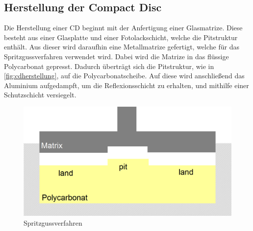 \subsection{Herstellung der Compact Disc}
\label{subsec:cdherstellung}

Die Herstellung einer CD beginnt mit der Anfertigung einer Glasmatrize. Diese
besteht aus einer Glasplatte und einer Fotolackschicht, welche die Pitstruktur
enthält. Aus dieser wird daraufhin eine Metallmatrize gefertigt, welche für das
Spritzgussverfahren verwendet wird. Dabei wird die Matrize in das flüssige
Polycarbonat gepresst. Dadurch überträgt sich die Pitstruktur, wie in
\autoref{fig:cdherstellung}, auf die Polycarbonatscheibe. Auf diese wird
anschließend das Aluminium aufgedampft, um die Reflexionsschicht zu erhalten,
und mithilfe einer Schutzschicht versiegelt. \cite{cdp}

\begin{figure}[h]
  \begin{center}
      \begin{minipage}[t]{\textwidth}
        \begin{center}
            \includegraphics[height=0.1\textheight]{Bilder/Optische_Datentraeger_Die_Compact_Disc/Herstellung/cdherstellung.png}
            \caption[Spritzgussverfahren \newline \url{http://daten.didaktikchemie.uni-bayreuth.de/umat/cd_dvd/spritzguss.gif} (zuletzt aufgerufen am 07.08.2015)]{Spritzgussverfahren}
            \label{fig:cdherstellung}
        \end{center}
      \end{minipage}
  \end{center}
\end{figure}

